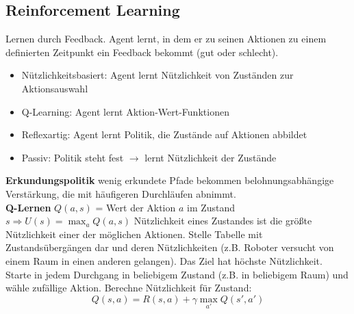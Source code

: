 \documentclass[12pt]{article}
\begin{document}
	\subsection{Reinforcement Learning}
	Lernen durch Feedback. Agent lernt, in dem er zu seinen Aktionen zu einem definierten Zeitpunkt ein Feedback bekommt (gut oder schlecht).
	\begin{itemize}
		\item Nützlichkeitsbasiert: Agent lernt Nützlichkeit von Zuständen zur Aktionsauswahl
		\item Q-Learning: Agent lernt Aktion-Wert-Funktionen
		\item Reflexartig: Agent lernt Politik, die Zustände auf Aktionen abbildet
		\item Passiv: Politik steht fest $\rightarrow$ lernt Nützlichkeit der Zustände
	\end{itemize}
	\textbf{Erkundungspolitik} wenig erkundete Pfade bekommen belohnungsabhängige Verstärkung, die mit häufigeren Durchläufen abnimmt.\\
	\textbf{Q-Lernen} $Q(a,s)$ = Wert der Aktion $a$ im Zustand $s \Rightarrow U(s) = \max_a Q(a,s)$ Nützlichkeit eines Zustandes ist die größte Nützlichkeit einer der möglichen Aktionen. Stelle Tabelle mit Zustandsübergängen dar und deren Nützlichkeiten (z.B. Roboter versucht von einem Raum in einen anderen gelangen). Das Ziel hat höchste Nützlichkeit. Starte in jedem Durchgang in beliebigem Zustand (z.B. in beliebigem Raum) und wähle zufällige Aktion. Berechne Nützlichkeit für Zustand:
	$$Q(s,a) = R(s,a) + \gamma \max_{a'} Q(s',a')$$
	
\end{document}

